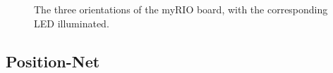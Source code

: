 \documentclass{article}
\begin{document}
\begin{figure}[h]
\centering
\hspace{-0cm}  

%
{}%
{}%
\caption{The three orientations of the myRIO board, with the corresponding LED illuminated.}
    
    

\label{fig:pos}
\end{figure}

\subsection{Position-Net}
\end{document}
